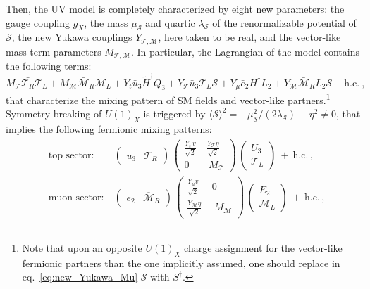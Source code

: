 Then, the UV model is completely characterized by eight new parameters: the gauge coupling $g_{X}$, the mass $\mu_{\mathcal{S}}$ and quartic $\lambda_{\mathcal{S}}$ of the renormalizable potential of $\mathcal{S}$, the new Yukawa couplings $Y_{\mathcal{T},\mathcal{M}}$, here taken to be real, and the vector-like mass-term parameters $M_{\mathcal{T},\mathcal{M}}$.
In particular, the Lagrangian of the model contains the following terms:
\begin{equation}
	\label{eq:new_Yukawa_Mu}
	M_{\mathcal{T}} \bar{\mathcal{T}_R} \mathcal{T}_L + M_{\mathcal{M}} \bar{\mathcal{M}}_R \mathcal{M}_L +
	Y_{t} \bar{u}_{3} \tilde{H}^\dagger Q_{3}  
	+ Y_{\mathcal{T}} \bar{u}_{3} \mathcal{T}_L \mathcal{S} 
	+ Y_{\mu} \bar{e}_{2}  H^\dagger  L_{2}
	+ Y_{\mathcal{M}}\bar{\mathcal{M}}_R L_{2} \mathcal{S} + \mathrm{h.c.}  \ , 
\end{equation}
that characterize the mixing pattern of SM fields and vector-like partners.\footnote{Note that upon an opposite $U(1)_{X}$ charge assignment for the vector-like fermionic partners than the one implicitly assumed, one should replace in eq.~\eqref{eq:new_Yukawa_Mu} $\mathcal{S}$ with $S^{\dagger}$.}
Symmetry breaking of $U(1)_X$ is triggered by $\langle \mathcal{S} \rangle^2 = -\mu^2_{\mathcal{S}}/(2 \lambda_{\mathcal{S}}) \equiv \eta^2 \neq 0$, that implies the following fermionic mixing patterns:
\begin{eqnarray}
	\label{eq:Mixing_Partner}
	& \textrm{top sector:} & \ 
	\left(  \begin{array}{cc}
		\bar{u}_3 & \overline{\mathcal{T}}_R
	\end{array} \right) \, \begin{pmatrix}
		\frac{Y_t  \, v}{\sqrt{2}} \ &  \frac{Y_{\mathcal{T}} \eta}{\sqrt{2}} \ \\
		0 \ & \ M_\mathcal{T}
	\end{pmatrix} \,
	\left(  \begin{array}{c}
		U_3 \\  \mathcal{T}_L
	\end{array} \right) \ + \ \mathrm{h.c.} \, , \\
	& \textrm{muon sector:} & \ 
	\left(  \begin{array}{cc}
		\bar{e}_2 & \overline{\mathcal{M}}_{R}
	\end{array} \right) \, \begin{pmatrix}
		\frac{Y_\mu v}{\sqrt{2}} \ & 0\ \\
		\frac{Y_{\mathcal{M}} \eta }{ \sqrt{2}}  \ & \ M_\mathcal{M}
	\end{pmatrix} \,
	\left(  \begin{array}{c}
		E_{2} \\  \mathcal{M}_L
	\end{array} \right) \ + \ \mathrm{h.c.} \, , \nonumber
\end{eqnarray}
